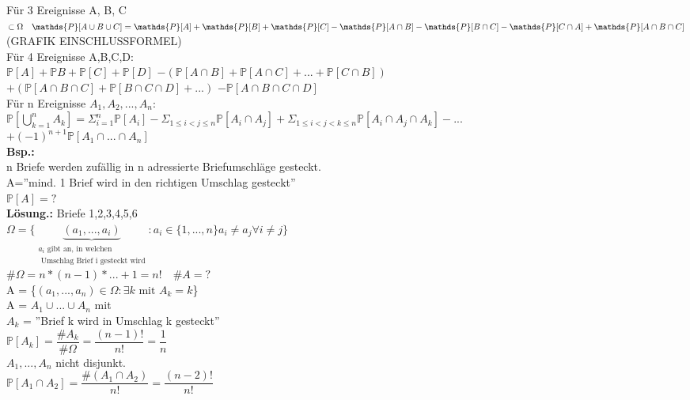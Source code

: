 	Für 3 Ereignisse A, B, C $\subset \Omega \quad \mathds{P}[A\cup B \cup C]=
	\\\mathds{P}[A]+\mathds{P}[B]+\mathds{P}[C]-\mathds{P}[A\cap B] - \mathds{P}[B \cap C]-\mathds{P}[C\cap A] + \mathds{P}[A\cap B \cap C]$\medskip\\
	(GRAFIK EINSCHLUSSFORMEL)\medskip\\
	Für 4 Ereignisse A,B,C,D:\\
	$\mathds{P}[A]+\mathds{P}B+\mathds{P}[C]+\mathds{P}[D]$
	$-(\mathds{P}[A\cap B]+\mathds{P}[A\cap C ]+...+\mathds{P}[C\cap B]) $\smallskip
\\	$+ (\mathds{P}[A \cap B \cap C ] + \mathds{P}[B \cap C \cap D]+...)$
	$-\mathds{P}[A\cap B \cap C \cap D]$\medskip\\
	Für n Ereignisse $A_1,A_2,...,A_n$:\\
	$\mathds{P}[\bigcup^n_{k=1}A_k]=\Sigma^n_{i=1}\mathds{P}[A_i]-\Sigma_{1\leq i < j \leq n}\mathds{P}[A_i\cap A_j]+\Sigma_{1\leq i < j<k\leq n} \mathds{P}[A_i\cap A_j\cap A_k]- ... $\smallskip\\
	$+ (-1)^{n+1}\mathds{P}[A_1\cap ... \cap A_n]$\medskip\\
	\textbf{Bsp.:}\\
n Briefe werden zufällig in n adressierte Briefumschläge gesteckt.\\
A=''mind. 1 Brief wird in den richtigen Umschlag gesteckt''\\
$\mathds{P}[A] = ?$\medskip\\
\textbf{Lösung.:} \hspace{3cm} Briefe 1,2,3,4,5,6\\
$\Omega = \{\underbrace{(a_1,...,a_i)}_{\substack{a_i\text{ gibt an, in welchen}\\\text{ Umschlag Brief i gesteckt wird}}}: a_i \in \{1,...,n\} a_i \neq a_j \forall i \neq j \}$\medskip\\
\#$\Omega = n*(n-1)*...+1=n! \quad \#A = ?$\\
A = \{$(a_1,...,a_n)\in \Omega: \exists k \text{ mit } A_k = k$\}\medskip\\
A = $A_1\cup ...\cup A_n$ mit \\
$A_k$ = ''Brief k wird in Umschlag k gesteckt''\medskip\\
$\mathds{P}[A_k] = \dfrac{\#A_k}{\#\Omega}=\dfrac{(n-1)!}{n!} = \dfrac{1}{n}$\smallskip\\
$A_1,...,A_n $ nicht disjunkt.\\
$\mathds{P}[A_1\cap A_2] = \dfrac{\#(A_1 \cap A_2)}{n!} = \dfrac{(n-2)!}{n!}$\medskip\\
